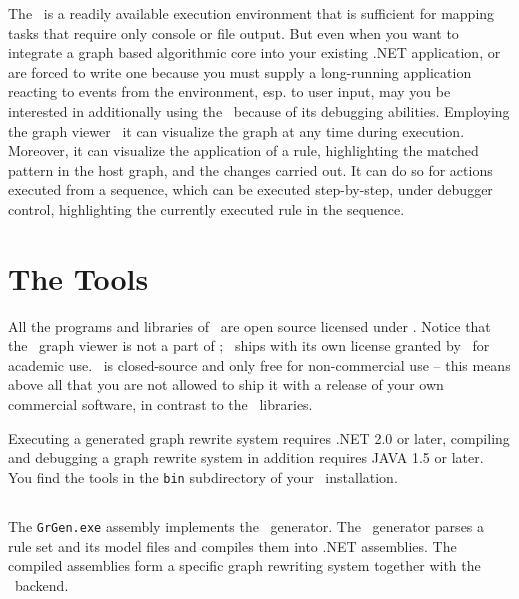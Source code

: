 The \GrShell\ is a readily available execution environment that is sufficient for mapping tasks that require only console or file output.
But even when you want to integrate a graph based algorithmic core into your existing .NET application, 
or are forced to write one because you must supply a long-running application reacting to events from the environment, esp. to user input,
may you be interested in additionally using the \GrShell\ because of its debugging abilities.
Employing the graph viewer \yComp\ it can visualize the graph at any time during execution.
Moreover, it can visualize the application of a rule, highlighting the matched pattern in the host graph, and the changes carried out.
It can do so for actions executed from a sequence, which can be executed step-by-step, under debugger control, highlighting the currently executed rule in the sequence.

\section{The Tools}

All the programs and libraries of \GrG\ are open source licensed under .
Notice that the \yComp\ graph viewer is not a part of \GrG ; \yComp\ ships with its own license granted by \yFiles\ for academic use.
\yComp\ is closed-source and only free for non-commercial use --
this means above all that you are not allowed to ship it with a release of your own commercial software, in contrast to the \GrG\ libraries.

Executing a generated graph rewrite system requires .NET 2.0 or later, compiling and debugging a graph rewrite system in addition requires JAVA 1.5 or later. 
You find the tools in the \texttt{bin} subdirectory of your \GrG\ installation.

\subsection{\texttt{}} \label{grgenoptions}

\noindent The \texttt{GrGen.exe} assembly implements the \GrG\ generator.
The \GrG\ generator parses a rule set and its model files and compiles them into .NET assemblies.
The compiled assemblies form a specific graph rewriting system together with the \GrG\ backend.


